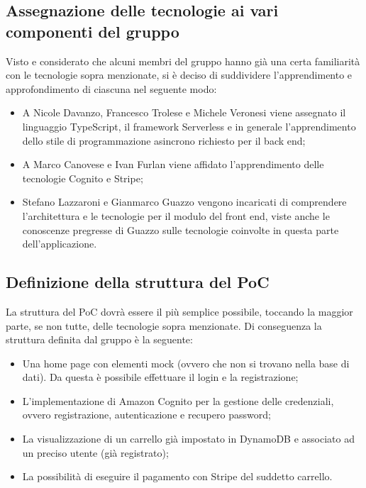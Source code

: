 \subsection{Assegnazione delle tecnologie ai vari componenti del gruppo}
Visto e considerato che alcuni membri del gruppo hanno già una certa familiarità con le tecnologie sopra menzionate, si è deciso di suddividere l'apprendimento e approfondimento di ciascuna nel seguente modo:
\begin{itemize}
	\item A Nicole Davanzo, Francesco Trolese e Michele Veronesi viene assegnato il linguaggio TypeScript, il framework Serverless e in generale l'apprendimento dello stile di programmazione asincrono richiesto per il back end;
	\item A Marco Canovese e Ivan Furlan viene affidato l'apprendimento delle tecnologie Cognito e Stripe;
	\item Stefano Lazzaroni e Gianmarco Guazzo vengono incaricati di comprendere l'architettura e le tecnologie per il modulo del front end, viste anche le conoscenze pregresse di Guazzo sulle tecnologie coinvolte in questa parte dell'applicazione.
\end{itemize}

\subsection{Definizione della struttura del PoC}
La struttura del PoC dovrà essere il più semplice possibile, toccando la maggior parte, se non tutte, delle tecnologie sopra menzionate.
Di conseguenza la struttura definita dal gruppo è la seguente:
\begin{itemize}
	\item Una home page con elementi mock (ovvero che non si trovano nella base di dati). Da questa è possibile effettuare il login e la registrazione;
	\item L'implementazione di Amazon Cognito per la gestione delle credenziali, ovvero registrazione, autenticazione e recupero password;
	\item La visualizzazione di un carrello già impostato in DynamoDB e associato ad un preciso utente (già registrato);
	\item La possibilità di eseguire il pagamento con Stripe del suddetto carrello.
\end{itemize}

